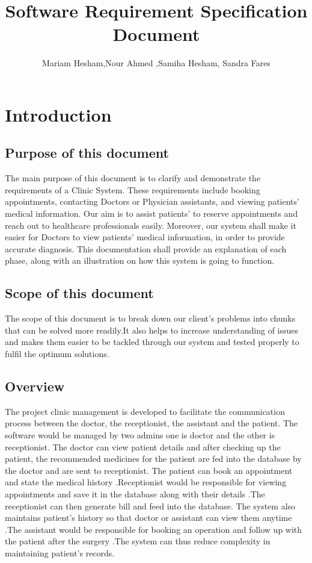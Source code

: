 \documentclass[]{article}
\title{Software Requirement Specification Document}
\author{Mariam Hesham,Nour Ahmed ,Samiha Hesham, Sandra Fares }
\begin{document}
\maketitle

\section{Introduction}

\subsection{Purpose of this document}
The main purpose of this document is to clarify and demonstrate the requirements of a Clinic System. These requirements include booking appointments, contacting Doctors or Physician assistants, and viewing patients' medical information. Our aim is to assist patients' to reserve appointments and reach out to healthcare professionals easily. Moreover, our system shall make it easier for Doctors to view patients' medical information, in order to provide accurate diagnosis. This documentation shall provide an explanation of each phase, along with an illustration on how this system is going to function. 

\subsection{ Scope of this document}
The scope of this document is to break down our client's problems into chunks that can be solved more readily.It also helps to increase understanding of issues and makes them easier to be tackled through our system and tested properly to fulfil the optimum solutions. 


\subsection{Overview}

The project clinic management is developed to facilitate the communication process between the doctor, the receptionist, the assistant and the patient. The software would be managed by two admins one is doctor and the other is receptionist. The doctor can view patient details and after checking up the patient, the recommended medicines for the patient are fed into the database by the doctor and are sent to receptionist. The patient can book an appointment and state the medical history .Receptionist would be responsible for viewing appointments and save it in the database along with their details .The receptionist can then generate bill and feed into the database. The system also maintains patient’s history so that doctor or assistant can view them anytime .The assistant would be responsible for booking an operation and follow up with the patient after the surgery .The system can thus reduce complexity in maintaining patient’s records.
\end{document}
